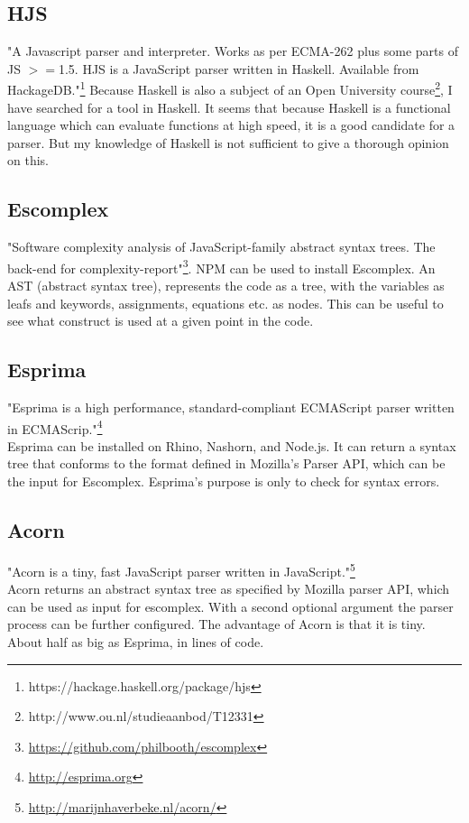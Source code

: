 \documentclass{article}
\begin{document}
\subsection{HJS}
"A Javascript parser and interpreter. Works as per ECMA-262 plus some parts of JS $>=$1.5.
HJS is a JavaScript parser written in Haskell. Available from HackageDB."\footnote{https://hackage.haskell.org/package/hjs}
Because Haskell is also a subject of an Open University course\footnote{http://www.ou.nl/studieaanbod/T12331}, I have searched for a tool in Haskell.
It seems that because Haskell is a functional language which can evaluate functions at high speed, it is a good candidate for a parser.
But my knowledge of Haskell is not sufficient to give a thorough opinion on this.

\subsection{Escomplex}
"Software complexity analysis of JavaScript-family abstract syntax trees. The back-end for complexity-report"\footnote{\url{https://github.com/philbooth/escomplex}}.
NPM can be used to install Escomplex.
An AST (abstract syntax tree), represents the code as a tree, with the variables as leafs and keywords, assignments, equations etc. as nodes.
This can be useful to see what construct is used at a given point in the code.

\subsection{Esprima}
"Esprima is a high performance, standard-compliant ECMAScript parser written in ECMAScrip."\footnote{\url{http://esprima.org}}\\
Esprima can be installed on Rhino, Nashorn, and Node.js.
It can return a syntax tree that conforms to the format defined in Mozilla's Parser API, which can be the input for Escomplex.
Esprima's purpose is only to check for syntax errors.

\subsection{Acorn}
"Acorn is a tiny, fast JavaScript parser written in JavaScript."\footnote{\url{http://marijnhaverbeke.nl/acorn/}}\\
Acorn returns an abstract syntax tree as specified by Mozilla parser API, which can be used as input for escomplex.
With a second optional argument the parser process can be further configured.
The advantage of Acorn is that it is tiny. About half as big as Esprima, in lines of code.
\end{document}
